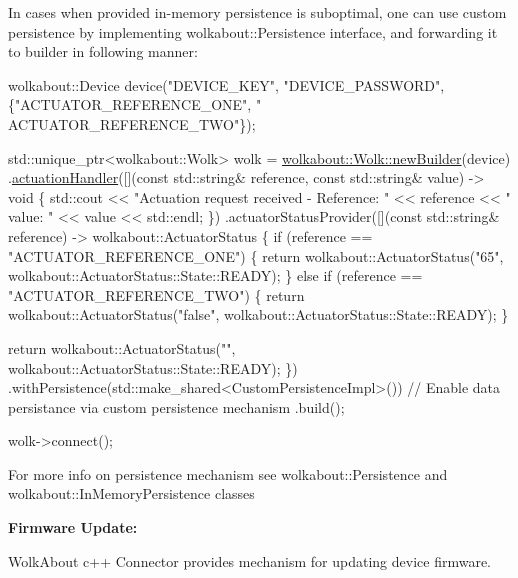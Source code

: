 In cases when provided in-\/memory persistence is suboptimal, one can use custom persistence by implementing wolkabout\+::\+Persistence interface, and forwarding it to builder in following manner\+:


\begin{DoxyCode}
wolkabout::Device device(\textcolor{stringliteral}{"DEVICE\_KEY"}, \textcolor{stringliteral}{"DEVICE\_PASSWORD"}, \{\textcolor{stringliteral}{"ACTUATOR\_REFERENCE\_ONE"}, \textcolor{stringliteral}{"
      ACTUATOR\_REFERENCE\_TWO"}\});

std::unique\_ptr<wolkabout::Wolk> wolk =
  \hyperlink{classwolkabout_1_1Wolk_a91270bb8552c2dee634e552111db4bb0}{wolkabout::Wolk::newBuilder}(device)
    .\hyperlink{classwolkabout_1_1WolkBuilder_a5c8799ad21b6bb0f0c866af3295a69b7}{actuationHandler}([](\textcolor{keyword}{const} std::string& reference, \textcolor{keyword}{const} std::string& value) -> \textcolor{keywordtype}{void} \{
        std::cout << \textcolor{stringliteral}{"Actuation request received - Reference: "} << reference << \textcolor{stringliteral}{" value: "} << value << 
      std::endl;
    \})
    .actuatorStatusProvider([](\textcolor{keyword}{const} std::string& reference) -> wolkabout::ActuatorStatus \{
        \textcolor{keywordflow}{if} (reference == \textcolor{stringliteral}{"ACTUATOR\_REFERENCE\_ONE"}) \{
            \textcolor{keywordflow}{return} wolkabout::ActuatorStatus(\textcolor{stringliteral}{"65"}, wolkabout::ActuatorStatus::State::READY);
        \} \textcolor{keywordflow}{else} \textcolor{keywordflow}{if} (reference == \textcolor{stringliteral}{"ACTUATOR\_REFERENCE\_TWO"}) \{
            \textcolor{keywordflow}{return} wolkabout::ActuatorStatus(\textcolor{stringliteral}{"false"}, wolkabout::ActuatorStatus::State::READY);
        \}

        \textcolor{keywordflow}{return} wolkabout::ActuatorStatus(\textcolor{stringliteral}{""}, wolkabout::ActuatorStatus::State::READY);
    \})
    .withPersistence(std::make\_shared<CustomPersistenceImpl>()) \textcolor{comment}{// Enable data persistance via custom
       persistence mechanism}
    .build();

    wolk->connect();
\end{DoxyCode}


For more info on persistence mechanism see wolkabout\+::\+Persistence and wolkabout\+::\+In\+Memory\+Persistence classes

{\bfseries Firmware Update\+:}

Wolk\+About c++ Connector provides mechanism for updating device firmware.

